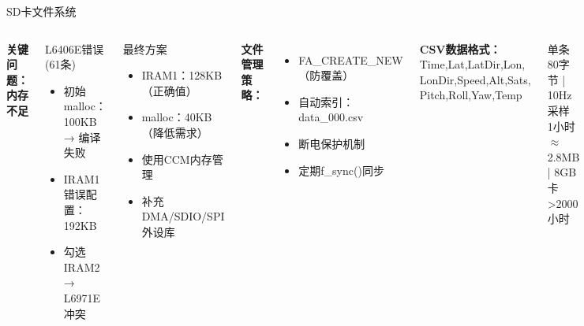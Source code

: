 \documentclass[10pt,aspectratio=169,mathserif]{beamer}
\begin{document}
\begin{frame}{SD卡文件系统}
    \begin{columns}
    \textbf{{\color{red}关键问题：内存不足}}
    \begin{block}{L6406E错误 (61条)}
    \begin{itemize}
        \item {\color{red}初始malloc：100KB → 编译失败}
        \item {\color{red}IRAM1错误配置：192KB}
        \item {\color{red}勾选IRAM2 → L6971E冲突}
    \end{itemize}
    \end{block}

    \begin{block}{{\color{green!60!black}最终方案}}
    \begin{itemize}
        \item IRAM1：128KB（正确值）
        \item malloc：40KB（降低需求）
        \item 使用CCM内存管理
        \item 补充DMA/SDIO/SPI外设库
    \end{itemize}
    \end{block}

    \textbf{文件管理策略：}
    \begin{itemize}
        \item FA\_CREATE\_NEW（防覆盖）
        \item 自动索引：data\_000.csv
        \item 断电保护机制
        \item 定期f\_sync()同步
    \end{itemize}

    \vspace{0.1cm}
    \textbf{CSV数据格式：}\\
    {\tiny\ttfamily
    Time,Lat,LatDir,Lon,\\
    LonDir,Speed,Alt,Sats,\\
    Pitch,Roll,Yaw,Temp
    }

    \vspace{0.2cm}
    \begin{center}
    \small
    单条80字节 | 10Hz采样\\
    1小时$\approx$2.8MB | 8GB卡>2000小时
    \end{center}
    \end{columns}
\end{frame}
\end{document}
